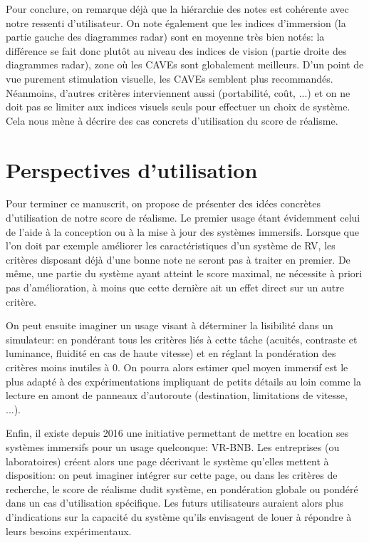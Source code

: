 \par Pour conclure, on remarque déjà que la hiérarchie des notes est cohérente avec notre ressenti d'utilisateur. On note également que les indices d'immersion (la partie gauche des diagrammes radar) sont en moyenne très bien notés: la différence se fait donc plutôt au niveau des indices de vision (partie droite des diagrammes radar), zone où les CAVEs sont globalement meilleurs. D'un point de vue purement stimulation visuelle, les CAVEs semblent plus recommandés. Néanmoins, d'autres critères interviennent aussi (portabilité, coût, ...) et on ne doit pas se limiter aux indices visuels seuls pour effectuer un choix de système. Cela nous mène à décrire des cas concrets d'utilisation du score de réalisme.

\section*{Perspectives d'utilisation}
\par Pour terminer ce manuscrit, on propose de présenter des idées concrètes d'utilisation de notre score de réalisme. Le premier usage étant évidemment celui de l'aide à la conception ou à la mise à jour des systèmes immersifs. Lorsque que l'on doit par exemple améliorer les caractéristiques d'un système de RV, les critères disposant déjà d'une bonne note ne seront pas à traiter en premier. De même, une partie du système ayant atteint le score maximal, ne nécessite à priori pas d'amélioration, à moins que cette dernière ait un effet direct sur un autre critère.

\par On peut ensuite imaginer un usage visant à déterminer la lisibilité dans un simulateur: en pondérant tous les critères liés à cette tâche (acuités, contraste et luminance, fluidité en cas de haute vitesse) et en réglant la pondération des critères moins inutiles à 0. On pourra alors estimer quel moyen immersif est le plus adapté à des expérimentations impliquant de petits détails au loin comme la lecture en amont de panneaux d'autoroute (destination, limitations de vitesse, ...).

\par Enfin, il existe depuis 2016 une initiative permettant de mettre en location ses systèmes immersifs pour un usage quelconque: VR-BNB. Les entreprises (ou laboratoires) créent alors une page décrivant le système qu'elles mettent à disposition: on peut imaginer intégrer sur cette page, ou dans les critères de recherche, le score de réalisme dudit système, en pondération globale ou pondéré dans un cas d'utilisation spécifique. Les futurs utilisateurs auraient alors plus d'indications sur la capacité du système qu'ils envisagent de louer à répondre à leurs besoins expérimentaux.